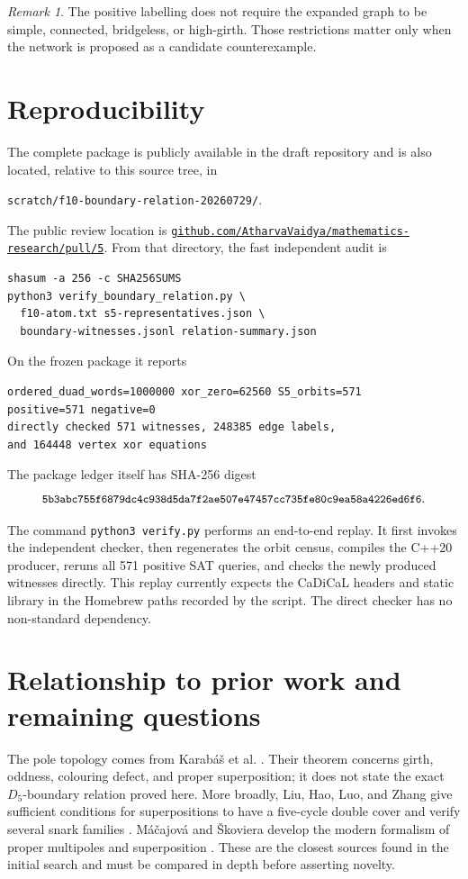 \documentclass[11pt]{article}
\theoremstyle{definition}
\theoremstyle{remark}
\newtheorem{remark}[theorem]{Remark}
\newcommand{\Dfive}{D_5}
\numberwithin{equation}{section}
\begin{document}
\begin{remark}
The positive labelling does not require the expanded graph to be simple,
connected, bridgeless, or high-girth.  Those restrictions matter only when
the network is proposed as a candidate counterexample.
\end{remark}

\section{Reproducibility}

The complete package is publicly available in the draft repository and is
also located, relative to this source tree, in
\begin{center}
\texttt{scratch/f10-boundary-relation-20260729/}.
\end{center}
The public review location is
\href{https://github.com/AtharvaVaidya/mathematics-research/pull/5}
{\texttt{github.com/AtharvaVaidya/mathematics-research/pull/5}}.
From that directory, the fast independent audit is
\begin{verbatim}
shasum -a 256 -c SHA256SUMS
python3 verify_boundary_relation.py \
  f10-atom.txt s5-representatives.json \
  boundary-witnesses.jsonl relation-summary.json
\end{verbatim}
On the frozen package it reports
\begin{verbatim}
ordered_duad_words=1000000 xor_zero=62560 S5_orbits=571
positive=571 negative=0
directly checked 571 witnesses, 248385 edge labels,
and 164448 vertex xor equations
\end{verbatim}
The package ledger itself has SHA-256 digest
\[
\small\texttt{5b3abc755f6879dc4c938d5da7f2ae507e47457cc735fe80c9ea58a4226ed6f6}.
\]

The command \texttt{python3 verify.py} performs an end-to-end replay.  It
first invokes the independent checker, then regenerates the orbit census,
compiles the C++20 producer, reruns all 571 positive SAT queries, and checks
the newly produced witnesses directly.  This replay currently expects the
CaDiCaL headers and static library in the Homebrew paths recorded by the
script.  The direct checker has no non-standard dependency.

\section{Relationship to prior work and remaining questions}

The pole topology comes from Karab\'a\v{s} et al.
\cite{KarabasEtAl2022}.  Their theorem concerns girth, oddness, colouring
defect, and proper superposition; it does not state the exact
\(\Dfive\)-boundary relation proved here.  More broadly, Liu, Hao, Luo,
and Zhang give sufficient conditions for superpositions to have a
five-cycle double cover and verify several snark families
\cite{LiuEtAl2023}.  M\'a\v{c}ajov\'a and \v{S}koviera develop the modern
formalism of proper multipoles and superposition
\cite{MacajovaSkoviera2021}.  These are the closest sources found in the
initial search and must be compared in depth before asserting novelty.
\end{document}
